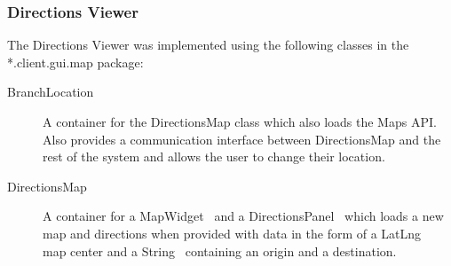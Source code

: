 \subsubsection{Directions Viewer}
The Directions Viewer was implemented using the following classes in the *.client.gui.map package:
\begin{description}
\item[BranchLocation] A container for the DirectionsMap class which also loads the Maps API. Also provides a communication interface between DirectionsMap and the rest of the system and allows the user to change their location.
\item[DirectionsMap] A container for a MapWidget~\cite{mwidget} and a DirectionsPanel~\cite{dpanel} which loads a new map and directions when provided with data in the form of a LatLng~\cite{latlng} map center and a String~\cite{string} containing an origin and a destination.
\end{description}
